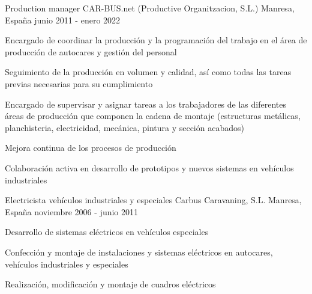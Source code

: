 

\begin{cventries}

  \cventry
    {Production manager} %
    {CAR-BUS.net (Productive Organitzacion, S.L.)} %
    {Manresa, España} %
    {junio 2011 - enero 2022} %
    {
      \begin{cvitems} %
        \item {Encargado de coordinar la producción y la programación del trabajo en el área de producción de autocares y gestión del personal}
        \item {Seguimiento de la producción en volumen y calidad, así como todas las tareas previas necesarias para su cumplimiento}
        \item {Encargado de supervisar y asignar tareas a los trabajadores de las diferentes áreas de producción que componen la cadena de montaje (estructuras metálicas, planchisteria, electricidad, mecánica, pintura y sección acabados)}
        \item {Mejora continua de los procesos de producción}
        \item {Colaboración activa en desarrollo de prototipos y nuevos sistemas en vehículos industriales}
      \end{cvitems}
    }

  \cventry
    {Electricista vehículos industriales y especiales} %
    {Carbus Caravaning, S.L.} %
    {Manresa, España} %
    {noviembre 2006 - junio 2011} %
    {
      \begin{cvitems} %
        \item {Desarrollo de sistemas eléctricos en vehículos especiales}
        \item {Confección y montaje de instalaciones y sistemas eléctricos en autocares, vehículos industriales y especiales}
        \item {Realización, modificación y montaje de cuadros eléctricos}
      \end{cvitems}
    }


\end{cventries}
